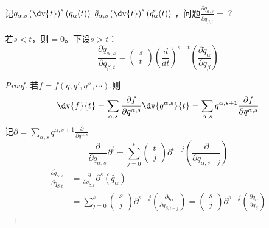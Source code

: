 \documentclass[12pt, a4paper, oneside, UTF8]{ctexbook}  %
\newcommand{\pa}{\partial}
\begin{document}
\begin{proposition}
    记\(q_{\alpha,s}\left(\dv{t}\right)^s\left(q_\alpha(t)\right)\)
    \(\tilde{q}_{\alpha,s}\left(\dv{t}\right)^s\left(\tilde{q_\alpha}(t)\right)\)
    ，问题\(\displaystyle
        \frac{\pa \tilde{q}_{\alpha,s}}{\pa \tilde{q}_{\beta,t}}=\;?\qquad
\)

若\(s<t\)，则\(=0\)。下设\(s>t\)：
\[
\frac{\partial\tilde{q}_{\alpha, s}}{\partial q_{\beta,t}}=
\begin{pmatrix}
s \\
t
\end{pmatrix}
\left(\frac{d}{dt}\right)^{s-t}
\left(\frac{\partial\tilde{q}_\alpha}{\partial q_\beta}\right)
\]
\begin{proof}
若\(f=f(q,q',q'',\cdots)\),则
\[
\dv{f}{t}=\sum_{\alpha,s}\frac{\pa f}{\pa q^{\alpha,s}}\dv{q^{\alpha,s}}{t}
=\sum_{\alpha,s}q^{\alpha,s+1}\frac{\pa f}{\pa q^{\alpha,s}}
\]
记\(\pa =\sum_{\alpha,s}q^{\alpha,s+1}\frac{\pa }{\pa q^{\alpha,s}}\)
\[
    \frac{\partial}{\partial q_{\alpha,s}}\pa^t=
    \sum_{j=0}^{t}
    \begin{pmatrix}
    t\\
    j
    \end{pmatrix}
    \pa^{t-j}
    \left(\frac{\partial}{\partial q_{\alpha,s-j}}\right)
\]
\begin{align*}
    \frac{\pa \tilde{q}_{\alpha,s}}{\pa \tilde{q}_{\beta,t}}
    &=\frac{\pa }{\pa q_{\beta,t}}\pa ^s(\tilde{q_\alpha})\\
    &=\sum_{j=0}^{s}
    \begin{pmatrix}
    s\\
    j
    \end{pmatrix}
    \pa^{s-j}
    \left(\frac{\partial \tilde{q_\alpha}}{\partial q_{\beta,t-j}}\right)
    =\begin{pmatrix}
        s\\
        j
        \end{pmatrix}
        \pa^{s-j}
        \left(\frac{\partial \tilde{q_\alpha}}{\partial q_\beta}\right)    
\end{align*}
\end{proof}
\end{proposition}
\end{document}
